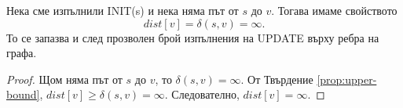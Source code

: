 \begin{prop}
  \label{prop:no-path}
  Нека сме изпълнили INIT(s)
  и нека няма път от $s$ до $v$.
  Тогава имаме свойството
  \[dist[v] = \delta(s,v) = \infty.\]
  То се запазва и след прозволен брой изпълнения на UPDATE върху ребра на графа.
\end{prop}
\begin{proof}
  Щом няма път от $s$ до $v$, то $\delta(s,v) = \infty$.
  От Твърдение \ref{prop:upper-bound}, $dist[v] \geq \delta(s,v) = \infty$.
  Следователно, $dist[v] = \infty$.
\end{proof}

  
  




